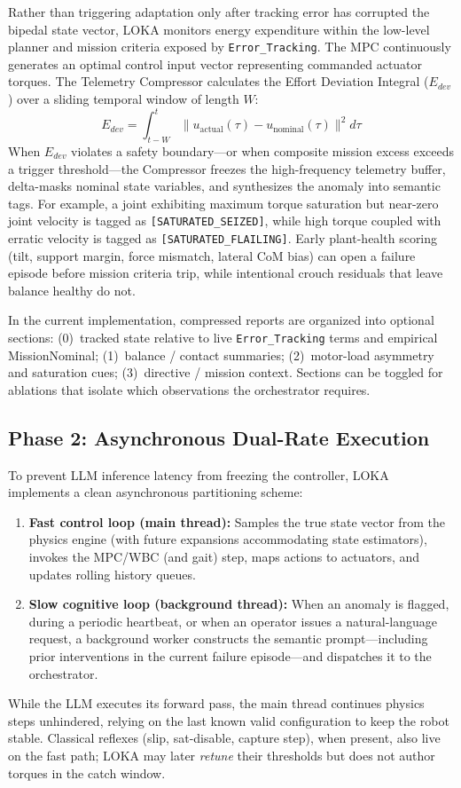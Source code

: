 Rather than triggering adaptation only after tracking error has corrupted the bipedal state vector, LOKA monitors energy expenditure within the low-level planner and mission criteria exposed by \texttt{Error\_Tracking}.
The MPC continuously generates an optimal control input vector representing commanded actuator torques.
The Telemetry Compressor calculates the Effort Deviation Integral ($E_{dev}$) over a sliding temporal window of length $W$:
\begin{equation}
E_{dev} = \int_{t-W}^{t} \| u_{\text{actual}}(\tau) - u_{\text{nominal}}(\tau) \|^2 d\tau
\label{eq:effort}
\end{equation}
When $E_{dev}$ violates a safety boundary---or when composite mission excess exceeds a trigger threshold---the Compressor freezes the high-frequency telemetry buffer, delta-masks nominal state variables, and synthesizes the anomaly into semantic tags.
For example, a joint exhibiting maximum torque saturation but near-zero joint velocity is tagged as \texttt{[SATURATED\_SEIZED]}, while high torque coupled with erratic velocity is tagged as \texttt{[SATURATED\_FLAILING]}.
Early plant-health scoring (tilt, support margin, force mismatch, lateral CoM bias) can open a failure episode before mission criteria trip, while intentional crouch residuals that leave balance healthy do not.

In the current implementation, compressed reports are organized into optional sections:
(0)~tracked state relative to live \texttt{Error\_Tracking} terms and empirical MissionNominal;
(1)~balance / contact summaries;
(2)~motor-load asymmetry and saturation cues;
(3)~directive / mission context.
Sections can be toggled for ablations that isolate which observations the orchestrator requires.

\subsection{Phase 2: Asynchronous Dual-Rate Execution}
\label{sec:async}

To prevent LLM inference latency from freezing the controller, LOKA implements a clean asynchronous partitioning scheme:
\begin{enumerate}
\item \textbf{Fast control loop (main thread):} Samples the true state vector from the physics engine (with future expansions accommodating state estimators), invokes the MPC/WBC (and gait) step, maps actions to actuators, and updates rolling history queues.
\item \textbf{Slow cognitive loop (background thread):} When an anomaly is flagged, during a periodic heartbeat, or when an operator issues a natural-language request, a background worker constructs the semantic prompt---including prior interventions in the current failure episode---and dispatches it to the orchestrator.
\end{enumerate}
While the LLM executes its forward pass, the main thread continues physics steps unhindered, relying on the last known valid configuration to keep the robot stable.
Classical reflexes (slip, sat-disable, capture step), when present, also live on the fast path; LOKA may later \emph{retune} their thresholds but does not author torques in the catch window.

